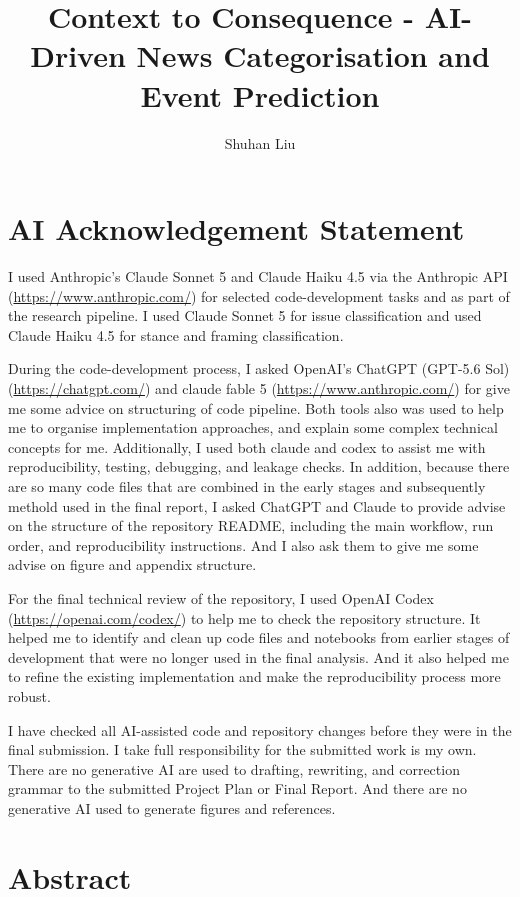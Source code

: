 \documentclass[final-report]{report-template}
\title{Context to Consequence - AI-Driven News Categorisation and Event Prediction}
\author{Shuhan Liu}
\begin{document}
\maketitlepage  %
\clearpage

\section*{AI Acknowledgement Statement}

I used Anthropic's Claude Sonnet 5 and Claude Haiku 4.5 via the Anthropic API
(\url{https://www.anthropic.com/}) for selected code-development tasks and as part of the research pipeline. I used Claude Sonnet 5 for issue classification and used Claude Haiku 4.5 for stance and framing classification. 

During the code-development process, I asked OpenAI's ChatGPT (GPT-5.6 Sol)
(\url{https://chatgpt.com/}) and claude fable 5 (\url{https://www.anthropic.com/}) for give me some advice on structuring of code pipeline. Both tools also was used to help me to organise implementation approaches, and explain some complex technical concepts for me. Additionally, I used both claude and codex to assist me with reproducibility, testing, debugging, and leakage checks. In addition, because there are so many code files that are combined in the early stages and subsequently methold used in the final report, I asked ChatGPT and Claude to provide advise on the structure of the repository README, including the main workflow, run order, and reproducibility instructions. And I also ask them to give me some advise on figure and appendix structure.

For the final technical review of the repository, I used OpenAI Codex
(\url{https://openai.com/codex/}) to help me to check the repository structure. It helped me to identify and clean up code files and notebooks from earlier stages of development that were no longer used in the final analysis. And it also helped me to refine the existing implementation and make the reproducibility process more robust.

I have checked all AI-assisted code and repository changes before they were in the final submission. I take full responsibility for the submitted work is my own. There are no generative AI are used to drafting, rewriting, and correction grammar to the submitted Project Plan or Final Report. And there are no generative AI used to generate figures and references.

\clearpage
\section*{Abstract}
\end{document}
